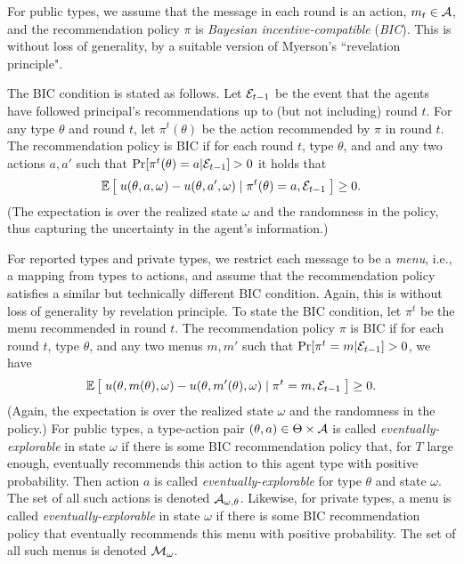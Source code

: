 For public types, we assume that the message in each round is an action, \ie $m_t \in \mathcal{A}$, and the recommendation policy $\pi$ is {\em Bayesian incentive-compatible} (\emph{BIC}). This is without loss of generality, by a suitable version of Myerson's ``revelation principle".

The BIC condition is stated as follows. Let $\mathcal{E}_{t-1}$ be the event that the agents have followed principal's recommendations up to (but not including) round $t$. For any type $\theta$ and round $t$, let $\pi^t(\theta)$ be the action recommended by $\pi$ in round $t$. The recommendation policy is BIC if for each round $t$, type $\theta$, and and any two actions $a,a'$ such that $\Pr[\pi^t(\theta) = a|\mathcal{E}_{t-1}] > 0$ it holds that
\begin{align}\label{eq:model-BIC-actions}
\mathbb{E}\left[\; u(\theta,a,\omega) - u(\theta,a',\omega) \mid \pi^t(\theta) =a, \mathcal{E}_{t-1}\;\right] \geq 0.
\end{align}
(The expectation is over the realized state $\omega$ and the randomness in the policy, thus capturing the uncertainty in the agent's information.)

For reported types and private types, we restrict each message to be a \emph{menu}, i.e., a mapping from types to actions, and assume that the recommendation policy satisfies a similar but technically different BIC condition. Again, this is without loss of generality by revelation principle. To state the BIC condition, let $\pi^t$ be the menu recommended in round $t$. The recommendation policy $\pi$ is BIC if for each round $t$, type $\theta$, and any two menus $m,m'$ such that
    $\Pr[\pi^t= m|\mathcal{E}_{t-1}] > 0$, we have
\begin{align}\label{eq:model-BIC-menus}
\mathbb{E}\left[\; u(\theta,m(\theta),\omega) - u(\theta,m'(\theta),\omega)
    \mid \pi^t = m, \mathcal{E}_{t-1}\;\right] \geq 0.
\end{align}
(Again, the expectation is over the realized state $\omega$ and the randomness in the policy.)
\vspace{-1mm}
For public types, a type-action pair $(\theta,a)\in \Theta\times \mathcal{A}$ is called \emph{eventually-explorable} in state $\omega$ if there is some BIC recommendation policy that, for $T$ large enough, eventually recommends this action to this agent type with positive probability. Then action $a$ is called \emph{eventually-explorable} for type $\theta$ and state $\omega$. The set of all such actions is denoted $\mathcal{A}_{\omega,\theta}$. Likewise, for private types, a menu is called \emph{eventually-explorable} in state $\omega$ if there is some BIC recommendation policy that eventually recommends this menu with positive probability. The set of all such menus is denoted $\mathcal{M}_{\omega}$.

